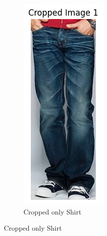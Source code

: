 \begin{figure}[H]
\begin{subfigure}[b]{0.2\textwidth}
      \includegraphics[width=\textwidth]{images/cropped_image.png}
      \caption{Cropped only Shirt}
  \end{subfigure}
\end{figure}

